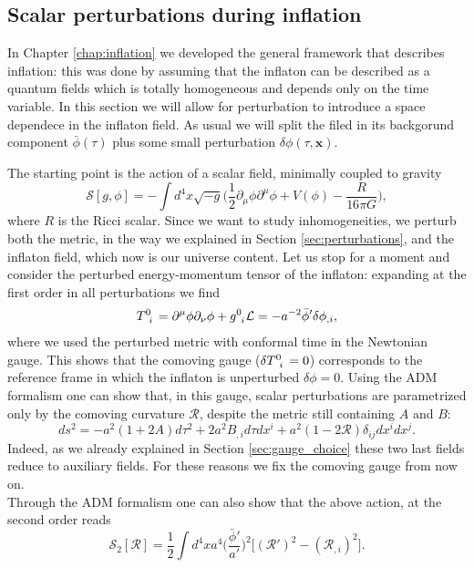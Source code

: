 \subsection{Scalar perturbations during inflation}
In Chapter \ref{chap:inflation} we developed the general framework that describes inflation: this was done by assuming that the inflaton can be described as a quantum fields which is totally homogeneous and depends only on the time variable. In this section we will allow for perturbation to introduce a space dependece in the inflaton field. As usual we will split the filed in its backgorund component $\bar\phi(\tau)$ plus some small perturbation $\delta\phi(\tau,\mathbf x)$.

The starting point is the action of a scalar field, minimally coupled to gravity
$$\mathcal{S} [g,\phi]=-\int d^4x\sqrt{-g}\bigg(\frac{1}{2}\partial_\mu\phi\partial^\mu\phi+V(\phi)-\frac{R}{16\pi G}\bigg),$$where $R$ is the Ricci scalar. Since we want to study inhomogeneities, we perturb both the metric, in the way we explained in Section \ref{sec:perturbations}, and the inflaton field, which now is our universe content. Let us stop for a moment and consider the perturbed energy-momentum tensor of the inflaton: expanding at the first order in all perturbations we find
\begin{align*}
    \tensor{T}{^0_i}=\partial^\mu\phi\partial_\nu\phi+\tensor{g}{^0_i}\mathcal{L}=-a^{-2}\bar\phi'\delta\phi_{,i},
\end{align*}
where we used the perturbed metric with conformal time in the Newtonian gauge. This shows that the comoving gauge ($\delta\tensor{T}{^0_i}=0$) corresponds to the reference frame in which the inflaton is unperturbed $\delta\phi=0$.
Using the ADM formalism one can show that, in this gauge, scalar perturbations are parametrized only by the comoving curvature $\mathcal{R}$, despite the metric still containing $A$ and $B$:
$$ds^2=-a^2(1+2A)d\tau^2+2a^2B_{,i}d\tau dx^i+a^2(1-2\mathcal{R})\delta_{ij}dx^idx^j.$$
Indeed, as we already explained in Section \ref{sec:gauge_choice} these two last fields reduce to auxiliary fields. For these reasons we fix the comoving gauge from now on.\\
Through the ADM formalism one can also show that the above action, at the second order reads
\begin{equation}
    \mathcal{S}_{2}[\mathcal{R} ]=\frac{1}{2}\int d^4x a^4\bigg(\frac{\bar \phi'}{a'}\bigg)^2\Big[(\mathcal{R}')^2-(\mathcal{R}_{,i})^2\Big].
\end{equation}
